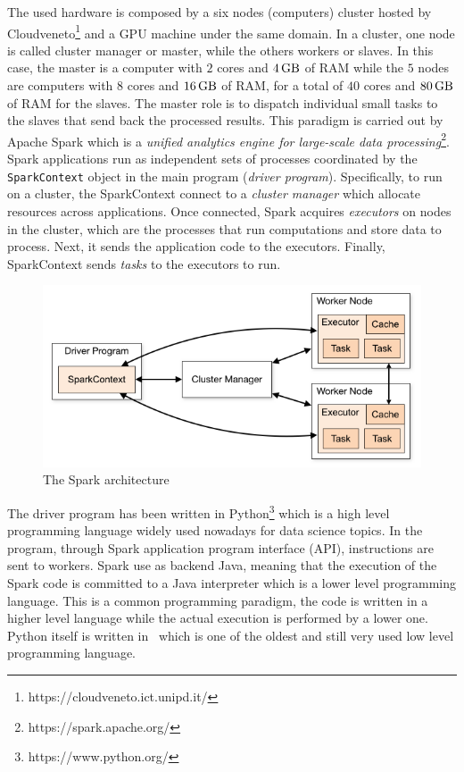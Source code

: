 The used hardware is composed by a six nodes (computers) cluster hosted by
Cloudveneto\footnote{https://cloudveneto.ict.unipd.it/} and a GPU machine
under the same domain. In a cluster, one node is called cluster manager or
master, while the others workers or slaves.
In this case, the master is a computer with $2$ cores and
$\SI{4}{\giga\byte}$ of RAM while the $5$ nodes are computers with $8$
cores and $\SI{16}{\giga\byte}$ of RAM, for a total of $40$ cores and
$\SI{80}{\giga\byte}$ of RAM for the slaves.
The master role is to dispatch individual small tasks to the slaves that
send back the processed results. This paradigm is carried out by Apache
Spark\cite{spark} which is a \textit{unified analytics engine for large-scale
 data processing}\footnote{https://spark.apache.org/}.
Spark applications run as independent sets of processes coordinated by the
\lstinline{SparkContext}
object in the main program (\textit{driver program}).
Specifically, to run on a cluster, the SparkContext connect
to a \textit{cluster manager} which allocate resources across applications.
Once connected, Spark acquires \textit{executors} on nodes in the cluster,
which are the processes that run computations and store data to process.
Next, it sends the application code to the executors. Finally, SparkContext
sends \textit{tasks} to the executors to run.
\begin{figure}[htpb]
 \includegraphics[scale=0.55]{figures/cluster-overview.png}
 \caption{The Spark architecture}
 \label{}
\end{figure}

The driver program has been written in Python\footnote{https://www.python.org/}
which is a high level programming language widely used nowadays for data
science topics. In the program, through Spark application program interface
(API), instructions are sent to workers. Spark use as backend Java, meaning
that the execution of the Spark code is committed to a Java interpreter which
is a lower level programming language. This is a common programming paradigm,
the code is written in a higher level language while the actual execution is
performed by a lower one. Python itself is written in \CC~which is one of the
oldest and still very used low level programming language.

